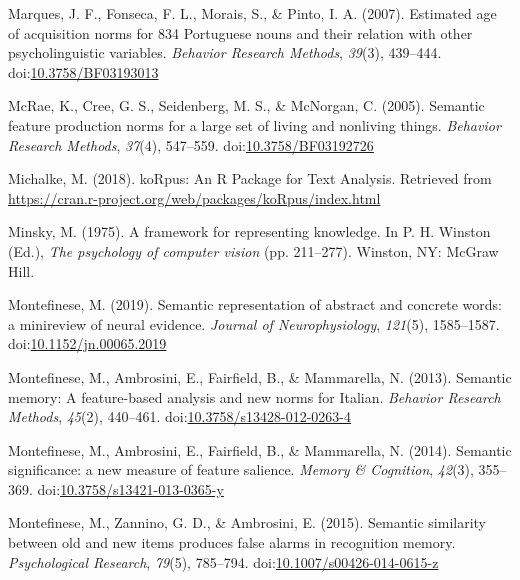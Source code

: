 \documentclass[man]{apa6}
\begin{document}
\leavevmode\hypertarget{ref-Marques2007a}{}%
Marques, J. F., Fonseca, F. L., Morais, S., \& Pinto, I. A. (2007). Estimated age of acquisition norms for 834 Portuguese nouns and their relation with other psycholinguistic variables. \emph{Behavior Research Methods}, \emph{39}(3), 439--444. doi:\href{https://doi.org/10.3758/BF03193013}{10.3758/BF03193013}

\leavevmode\hypertarget{ref-McRae2005}{}%
McRae, K., Cree, G. S., Seidenberg, M. S., \& McNorgan, C. (2005). Semantic feature production norms for a large set of living and nonliving things. \emph{Behavior Research Methods}, \emph{37}(4), 547--559. doi:\href{https://doi.org/10.3758/BF03192726}{10.3758/BF03192726}

\leavevmode\hypertarget{ref-Michalke2018}{}%
Michalke, M. (2018). koRpus: An R Package for Text Analysis. Retrieved from \url{https://cran.r-project.org/web/packages/koRpus/index.html}

\leavevmode\hypertarget{ref-Minsky1975}{}%
Minsky, M. (1975). A framework for representing knowledge. In P. H. Winston (Ed.), \emph{The psychology of computer vision} (pp. 211--277). Winston, NY: McGraw Hill.

\leavevmode\hypertarget{ref-Montefinese2019}{}%
Montefinese, M. (2019). Semantic representation of abstract and concrete words: a minireview of neural evidence. \emph{Journal of Neurophysiology}, \emph{121}(5), 1585--1587. doi:\href{https://doi.org/10.1152/jn.00065.2019}{10.1152/jn.00065.2019}

\leavevmode\hypertarget{ref-Montefinese2013}{}%
Montefinese, M., Ambrosini, E., Fairfield, B., \& Mammarella, N. (2013). Semantic memory: A feature-based analysis and new norms for Italian. \emph{Behavior Research Methods}, \emph{45}(2), 440--461. doi:\href{https://doi.org/10.3758/s13428-012-0263-4}{10.3758/s13428-012-0263-4}

\leavevmode\hypertarget{ref-Montefinese2014}{}%
Montefinese, M., Ambrosini, E., Fairfield, B., \& Mammarella, N. (2014). Semantic significance: a new measure of feature salience. \emph{Memory \& Cognition}, \emph{42}(3), 355--369. doi:\href{https://doi.org/10.3758/s13421-013-0365-y}{10.3758/s13421-013-0365-y}

\leavevmode\hypertarget{ref-Montefinese2015}{}%
Montefinese, M., Zannino, G. D., \& Ambrosini, E. (2015). Semantic similarity between old and new items produces false alarms in recognition memory. \emph{Psychological Research}, \emph{79}(5), 785--794. doi:\href{https://doi.org/10.1007/s00426-014-0615-z}{10.1007/s00426-014-0615-z}
\end{document}
